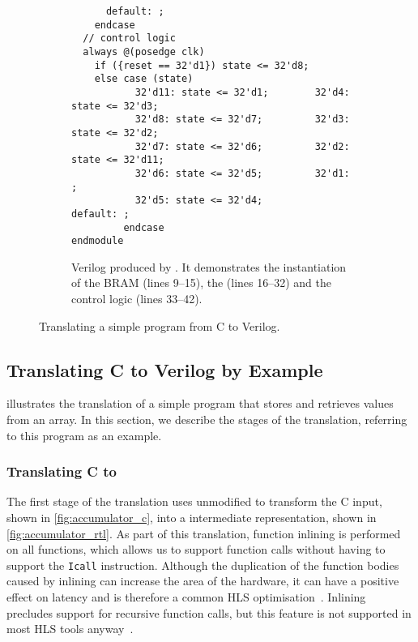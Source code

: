 \begin{figure}
\begin{subfigure}[b]{0.65\linewidth}
\begin{verbatim}
      default: ;
    endcase
  // control logic
  always @(posedge clk)
    if ({reset == 32'd1}) state <= 32'd8;
    else case (state)
           32'd11: state <= 32'd1;        32'd4: state <= 32'd3;
           32'd8: state <= 32'd7;         32'd3: state <= 32'd2;
           32'd7: state <= 32'd6;         32'd2: state <= 32'd11;
           32'd6: state <= 32'd5;         32'd1: ;
           32'd5: state <= 32'd4;         default: ;
         endcase
endmodule
\end{verbatim}
\caption{Verilog produced by \vericert{}. It demonstrates the instantiation of
  the \gls{BRAM} (lines 9--15), the  (lines 16--32) and the control logic (lines 33--42).}\label{fig:accumulator_v}
\end{subfigure}
\caption{Translating a simple program from C to Verilog.}\label{fig:accumulator_c_rtl}
\end{figure}

\subsection{Translating C to Verilog by Example}
 illustrates the translation of a simple program
that stores and retrieves values from an array.  In this section, we describe
the stages of the \vericert{} translation, referring to this program as an
example.

\subsubsection{Translating C to \rtl{}}

The first stage of the translation uses unmodified \compcert{} to transform the
C input, shown in \cref{fig:accumulator_c}, into a \rtl{} intermediate
representation, shown in \cref{fig:accumulator_rtl}.  As part of this
translation, function inlining is performed on all functions, which allows us to
support function calls without having to support the \texttt{Icall} \rtl{}
instruction.  Although the duplication of the function bodies caused by inlining
can increase the area of the hardware, it can have a positive effect on latency
and is therefore a common HLS optimisation~\cite{noronha17_rapid_fpga}. Inlining
precludes support for recursive function calls, but this feature is not
supported in most HLS tools anyway~\cite{thomas16_srcht}.

